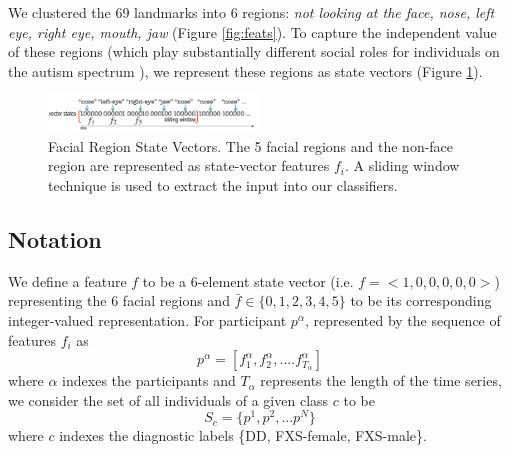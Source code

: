 \documentclass[10pt,twocolumn,letterpaper]{article}
\begin{document}
We clustered the 69 landmarks into 6 regions: \textit{not looking at the face, nose, left eye, right eye, mouth, jaw} (Figure \ref{fig:feats}). 
To capture the independent value of these regions (which play substantially different social roles for individuals on the autism spectrum \cite{klin2002}), we represent these regions as state vectors (Figure \ref{fig:statevectors}).


\begin{figure}[b]
        \centering
             \includegraphics[width=0.5\textwidth]{figures/vectors.png}
       \caption{Facial Region State Vectors. The 5 facial regions and the non-face region are represented as state-vector features $f_i$. A sliding window technique is used to extract the input into our classifiers.}
        \label{fig:statevectors}
\end{figure}

\subsection{Notation} 
\label{sec:notation}
We define a feature $f$ to be a 6-element state vector (i.e. $f=<1,0,0,0,0,0>$) representing the 6 facial regions and $\bar{f} \in \{0,1,2,3,4,5\}$ to be its corresponding integer-valued representation. For participant $p^\alpha$, represented by the sequence of features $f_i$ as
\begin{equation}
p^\alpha=[f_1^\alpha, f_2^\alpha,....f_{T_\alpha}^\alpha]
\end{equation}
where $\alpha$ indexes the participants and $T_\alpha$ represents the length of the time series, we consider the set of all individuals of a given class $c$ to be
\begin{equation}
S_c=\{p^1, p^2,...p^N \}
\end{equation}
 where $c$ indexes the diagnostic labels \{DD, FXS-female, FXS-male\}.
\end{document}
